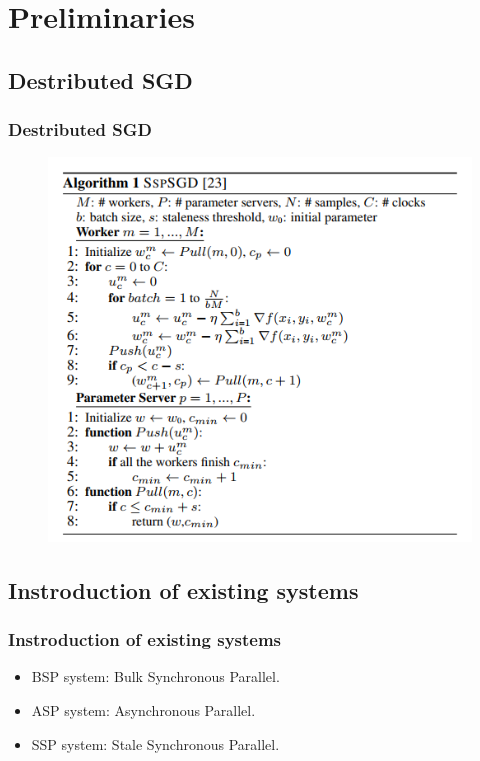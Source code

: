 \section{Preliminaries}

\subsection{Destributed SGD}
\begin{frame}
    \frametitle{Destributed SGD}
	\begin{figure}
		\includegraphics[scale=0.45]{figure/sgd.png}
	\end{figure}
\end{frame}

\subsection{Instroduction of existing systems}
\begin{frame}
    \frametitle{Instroduction of existing systems}
	\begin{itemize}
		\item BSP system: Bulk Synchronous Parallel. 
		\item ASP system: Asynchronous Parallel.
		\item SSP system: Stale Synchronous Parallel. 
	\end{itemize} 
\end{frame}
		
